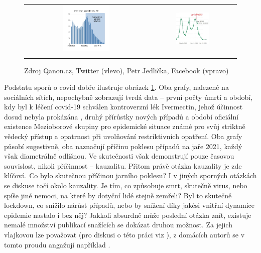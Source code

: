 \begin{figure}
\begin{center}
\begin{tabular}{cc}
\includegraphics[width=0.4\textwidth]{pic/ivernectin.pdf} & \includegraphics[width=0.4\textwidth]{pic/meses.png}\tabularnewline
\tabularnewline
\end{tabular}
\caption{Zdroj Qanon.cz, Twitter (vlevo), Petr Jedlička, Facebook (vpravo)}
\label{fig:iverjedl}
\end{center}
\end{figure}

Podstatu sporů o covid dobře ilustruje obrázek \ref{fig:iverjedl}. Oba grafy, nalezené na sociálních sítích, nepochybně zobrazují tvrdá data -- první počty úmrtí a období,
kdy byl k léčení covid-19 schválen kontroverzní
lék Ivermectin, jehož účinnost dosud nebyla prokázána \cite{mzcriver},
druhý přírůstky nových případů a období oficiální existence Mezioborové
skupiny pro epidemické situace \cite{zalozenimeses} známé pro svůj
striktně vědecký přístup a opatrnost při uvolňování restriktivních
opatření. Oba grafy působí sugestivně, oba naznačují příčinu poklesu případů
na jaře 2021, každý však diametrálně odlišnou. Ve skutečnosti však demonstrují pouze časovou souvislost, nikoli příčinnost -- kauzalitu. Přitom právě otázka kauzality je zde klíčová. Co bylo skutečnou příčinou jarního poklesu? I v jiných sporných otázkách se diskuse točí okolo kauzality. Je tím, co
způsobuje smrt, skutečně virus, nebo spíše jiné nemoci, na které by dotyční lidé stejně zemřeli? Byl to skutečně lockdown, co snížilo nárůst případů,
nebo by snížení díky jakési vnitřní dynamice epidemie nastalo i bez něj? Jakkoli
absurdně může poslední otázka znít, existuje nemalé množství publikací
snažících se dokázat druhou možnost. Za jejich vlajkovou lze považovat \cite{bendavid2021assessing}
(pro diskusi o této práci viz \cite{kluveitIoan}), z domácích autorů
se v tomto proudu angažují například \cite{hradsky2021demographic}. 

